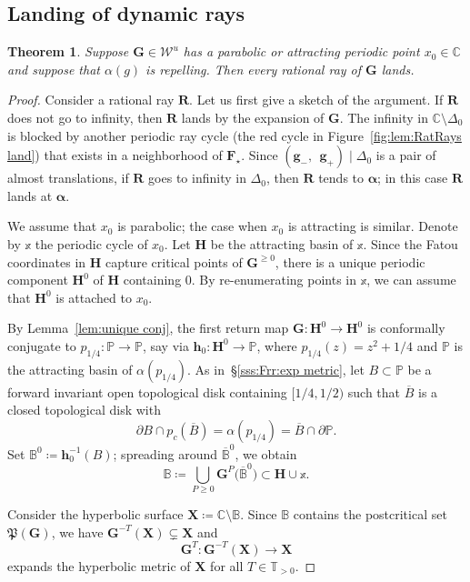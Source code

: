 \documentclass{amsart}
\renewcommand{\sp}{{\ \ }}
\newcommand{\1}{{\mathbb 1 }}
\newcommand\PT{\mathbb{ T}}
\newcommand{\bDelta}{{\mathbb{\Delta}}}
\newcommand{\bB}{{\mathbb{B}}}
\newcommand\Post{{\mathfrak P}}
\newcommand{\bF}{{\mathbf F}}
\newcommand{\bX}{{\mathbf X}}
\newcommand{\bR}{{\mathbf R}}
\newcommand{\bH}{{\mathbf H}}
\newcommand{\bG}{{\mathbf G}}
\newcommand{\bbh}{{\mathbf h}}
\newcommand{\bbg}{{\mathbf g}}
\newcommand{\str}{{\star}}
\newcommand{\bxx}{{\mathbb{x}}}
\newcommand\Unst{{\boldsymbol{\mathcal{W}}^u}}
\newcommand{\C}{\mathbb{C}}
\newcommand{\Parab}{\mathbb{P}}
\newtheorem{thm}{Theorem}[section]
\theoremstyle{remark}
\numberwithin{equation}{section}
\theoremstyle{definition}
\newcommand{\balpha}{{\boldsymbol \alpha}}
\theoremstyle{nonumberbreak}
\begin{document}
  
  
\subsection{Landing of dynamic rays}  
\begin{thm}
\label{thm:RatRays land}
Suppose $\bG\in \Unst$ has a parabolic or attracting periodic point ${x_0\in \C}$ and suppose that $\alpha(g)$ is repelling. Then 
every rational ray of $\bG$ lands. 
\end{thm}
\begin{proof}
Consider a rational ray $\bR$. Let us first give a sketch of the argument. If $\bR$ does not go to infinity, then $\bR$ lands by the expansion of $\bG$.  The infinity in $\C\setminus \bDelta_0$ is blocked by another periodic ray cycle (the red cycle in Figure~\ref{fig:lem:RatRays land}) that exists in a neighborhood of $\bF_\str$. Since $(\bbg_-,\sp \bbg_+)\mid \bDelta_0$ is a pair of almost translations, if $\bR$ goes to infinity in $\bDelta_0$, then $\bR$ tends to $\balpha$; in this case $\bR$ lands at $\balpha$.



We assume that $x_0$ is parabolic; the case when $x_0$ is attracting is similar. Denote by $\bxx$ the periodic cycle of $x_0$. Let $\bH$ be the attracting basin of $\bxx$. Since the Fatou coordinates in $\bH$ capture critical points of $\bG^{\ge 0}$, there is a unique periodic component $\bH^0$ of $\bH$ containing $0$. By re-enumerating points in $\bxx$, we can assume that $\bH^0$ is attached to $x_0$.


By Lemma~\ref{lem:unique conj}, the first return map $\bG\colon \bH^0\to \bH^0$ is conformally conjugate to $p_{1/4}\colon \Parab\to \Parab$, say via $\bbh_0\colon \bH^0\to \Parab$, where $p_{1/4}(z)=z^2+1/4$ and $ \Parab$ is the attracting basin of $\alpha(p_{1/4})$. As in~\S\ref{sss:Frr:exp metric}, let $B\subset \Parab$ be a forward invariant open topological disk containing $[1/4,1/2)$ such that $\overline B$ is a closed topological disk with 
\[\partial B\cap p_{c}(\overline B)=\alpha(p_{1/4})= \overline B \cap \partial \Parab.\] 
Set $\bB^0\coloneqq \bbh^{-1}_0(B)$; spreading around $\overline \bB^0$, we obtain
\[\bB\coloneqq \bigcup_{P\ge 0} \bG^P\big(\overline \bB^0\big) \subset \bH\cup \bxx.\]



 Consider the hyperbolic surface $\bX\coloneqq \C\setminus  \bB$. Since $\bB$ contains the postcritical set $\Post(\bG)$, we have $\bG^{-T}(\bX)\subsetneq \bX$ and 
\[
\bG^{T}\colon \bG^{-T}(\bX)\to \bX
\]expands the hyperbolic metric of $\bX$ for all $T\in \PT_{>0}$.



\end{proof}
\end{document}

